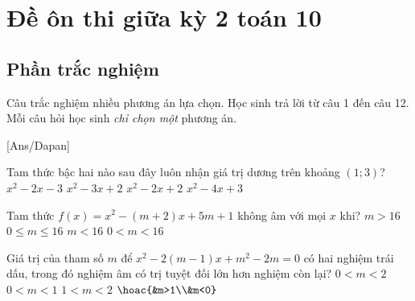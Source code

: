 \section{Đề ôn thi giữa kỳ 2 toán 10}
\subsection{Phần trắc nghiệm}
Câu trắc nghiệm nhiều phương án lựa chọn. Học sinh trả lời từ
câu 1 đến câu 12. Mỗi câu hỏi học sinh \textit{chỉ chọn một} phương án.

[Ans/Dapan]
 
\hienthiloigiaiex
\begin{ex}%
	Tam thức bậc hai nào sau đây luôn nhận giá trị dương trên khoảng $(1;3)$?
	\choice
	{$x^2-2 x-3$}
	{$x^2-3x+2$}
	{\True $x^2-2x+2$}
	{$x^2-4x+3$}
\end{ex}
\begin{ex}%
	Tam thức $f(x)=x^2-(m+2)x+5 m+1$ không âm với mọi $x$ khi?
	\choice
	{$m>16$}
	{\True $0\leq m\leq16$}
	{$m<16$}
	{$0<m<16$}
\end{ex}
  
 \begin{ex}%
 	Giá trị của tham số $m$ để $x^2-2(m-1) x+m^2-2 m=0$ có hai nghiệm trái dấu, trong đó nghiệm âm có trị tuyệt đối lớn hơn nghiệm còn lại?
 	\choice
 	{$0<m<2$}
 	{\True $0<m<1$}
 	{$1<m<2$}
 	{$\hoac{&m>1\\&m<0}$}
 \end{ex} 
  
